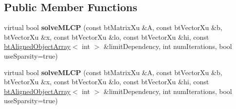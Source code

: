 \subsection*{Public Member Functions}
\begin{DoxyCompactItemize}
\item 
\mbox{\label{classbtDantzigSolver_a9c660881e66a59e3647da9e02c014725}} 
virtual bool {\bfseries solve\+M\+L\+CP} (const bt\+Matrix\+Xu \&A, const bt\+Vector\+Xu \&b, bt\+Vector\+Xu \&x, const bt\+Vector\+Xu \&lo, const bt\+Vector\+Xu \&hi, const \hyperlink{classbtAlignedObjectArray}{bt\+Aligned\+Object\+Array}$<$ int $>$ \&limit\+Dependency, int num\+Iterations, bool use\+Sparsity=true)
\item 
\mbox{\label{classbtDantzigSolver_a9c660881e66a59e3647da9e02c014725}} 
virtual bool {\bfseries solve\+M\+L\+CP} (const bt\+Matrix\+Xu \&A, const bt\+Vector\+Xu \&b, bt\+Vector\+Xu \&x, const bt\+Vector\+Xu \&lo, const bt\+Vector\+Xu \&hi, const \hyperlink{classbtAlignedObjectArray}{bt\+Aligned\+Object\+Array}$<$ int $>$ \&limit\+Dependency, int num\+Iterations, bool use\+Sparsity=true)
\end{DoxyCompactItemize}
